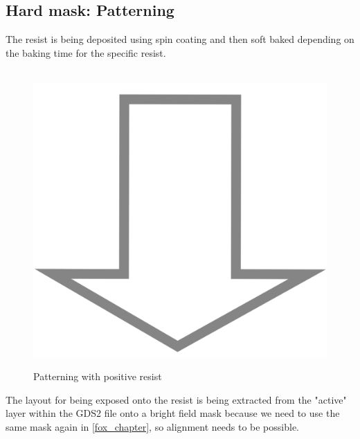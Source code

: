 \subsection{Hard mask: Patterning}

The resist is being deposited using spin coating and then soft baked depending on the baking time for the specific resist.

\begin{figure}[H]
	\centering
	\begin{tikzpicture}[node distance = 3cm, auto, thick,scale=\CrossSectionOnly, every node/.style={transform shape}]
		
	\end{tikzpicture} \\
	\includegraphics[scale=0.01]{down_arrow.png} \\
	\begin{tikzpicture}[node distance = 3cm, auto, thick,scale=\CrossSectionOnly, every node/.style={transform shape}]
		
	\end{tikzpicture}
	\caption{Patterning with positive resist}
\end{figure}

The layout for being exposed onto the resist is being extracted from the "active" layer within the GDS2 file onto a bright field mask because we need to use the same mask again in \autoref{fox_chapter}, so alignment needs to be possible.

